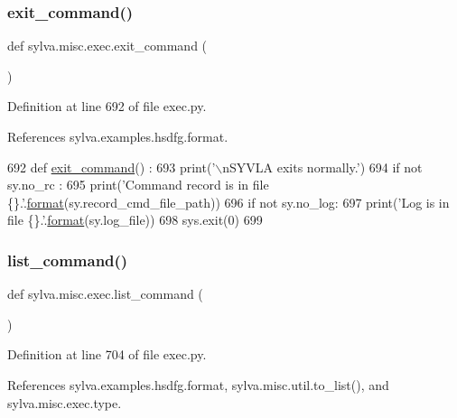 \subsubsection{\texorpdfstring{exit\+\_\+command()}{exit\_command()}}
{\footnotesize\ttfamily def sylva.\+misc.\+exec.\+exit\+\_\+command (\begin{DoxyParamCaption}{ }\end{DoxyParamCaption})}



Definition at line 692 of file exec.\+py.



References sylva.\+examples.\+hsdfg.\+format.


\begin{DoxyCode}
692 \textcolor{keyword}{def }\hyperlink{namespacesylva_1_1misc_1_1exec_afdee869cb32b6c18b9747718ac8dc475}{exit\_command}() :
693   print(\textcolor{stringliteral}{'\(\backslash\)nSYVLA exits normally.'})
694   \textcolor{keywordflow}{if} \textcolor{keywordflow}{not} sy.no\_rc :
695     print(\textcolor{stringliteral}{'Command record is in file \{\}.'}.\hyperlink{namespacesylva_1_1examples_1_1hsdfg_ab3510a0b8457362330aa4d9fd2209590}{format}(sy.record\_cmd\_file\_path))
696   \textcolor{keywordflow}{if} \textcolor{keywordflow}{not} sy.no\_log:
697     print(\textcolor{stringliteral}{'Log is in file \{\}.'}.\hyperlink{namespacesylva_1_1examples_1_1hsdfg_ab3510a0b8457362330aa4d9fd2209590}{format}(sy.log\_file))
698   sys.exit(0)
699 
\end{DoxyCode}
\mbox{\label{namespacesylva_1_1misc_1_1exec_af0ed98897004764988fba9af76290e90}} 
\subsubsection{\texorpdfstring{list\+\_\+command()}{list\_command()}}
{\footnotesize\ttfamily def sylva.\+misc.\+exec.\+list\+\_\+command (\begin{DoxyParamCaption}{ }\end{DoxyParamCaption})}



Definition at line 704 of file exec.\+py.



References sylva.\+examples.\+hsdfg.\+format, sylva.\+misc.\+util.\+to\+\_\+list(), and sylva.\+misc.\+exec.\+type.


